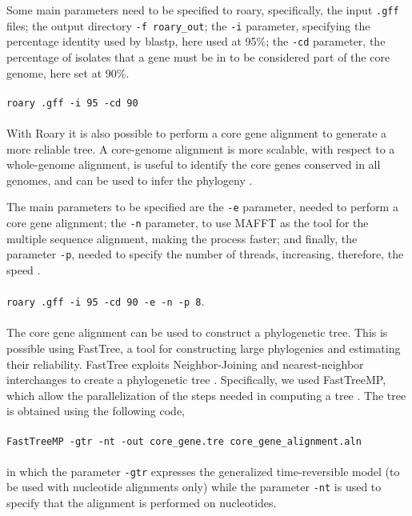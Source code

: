 \documentclass[a4paper,titlepage, oneside]{book}
\newcommand{\code}[1]{\colorbox{light-gray}{\texttt{#1}}}
\begin{document}
Some main parameters need to be specified to roary, specifically, the input \code{.gff} files; the output directory \code{-f roary\_out}; the \code{-i} parameter, specifying the percentage identity used by blastp, here used at 95\%; the \code{-cd} parameter, the percentage of isolates that a gene must be in to be considered part of the core genome, here set at 90\%.
\\ \newline \\ \code{roary .gff -i 95 -cd 90} \\ \newline \\


With Roary it is also possible to perform a core gene alignment to generate a more reliable tree. A core-genome alignment is more scalable, with respect to a whole-genome alignment, is useful to identify the core genes conserved in all genomes, and can be used to infer the phylogeny \cite{Core-align}.

The main parameters to be specified are the \code{-e} parameter, needed to perform a core gene alignment; the \code{-n} parameter, to use MAFFT as the tool for the multiple sequence alignment, making the process faster; and finally, the parameter \code{-p}, needed to specify the number of threads, increasing, therefore, the speed \cite{Roary}.
\\
\newline
\\
\code{roary .gff -i 95 -cd 90 -e -n -p 8}.
\\
\newline
\\
The core gene alignment can be used to construct a phylogenetic tree. This is possible using FastTree, a tool for constructing large phylogenies and estimating their reliability. FastTree exploits Neighbor-Joining and nearest-neighbor interchanges to create a phylogenetic tree \cite{FastTree}.
Specifically, we used FastTreeMP, which allow the parallelization of the steps needed in computing a tree \cite{FTMP}.
The tree is obtained using the following code,\\ \newline \\ \code{FastTreeMP -gtr -nt -out core\_gene.tre core\_gene\_alignment.aln}\\ \newline \\ in which the parameter \code{-gtr} expresses the generalized time-reversible model (to be used with nucleotide alignments only) while the parameter \code{-nt} is used to specify that the alignment is performed on nucleotides.
\end{document}
